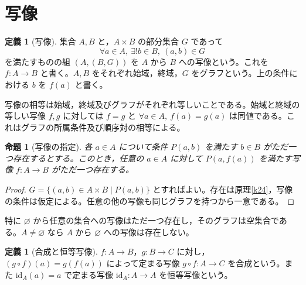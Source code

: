 \documentclass[a5paper,10pt,dvipdfmx]{jsarticle}
\theoremstyle{definition}
\newtheorem{defn}[ruledef]{定義}
\theoremstyle{plain}
\newtheorem{prop}[ruledef]{命題}
\newcommand{\id}{\mathrm{id}}
\begin{document}
\section{写像}
\begin{defn}[写像]\label{k34}
集合 $A,B$ と，$A\times B$ の部分集合 $G$ であって
\[
 \forall a\in A,\ \exists!b\in B,\ (a,b)\in G
\]
を満たすものの組 $(A,(B,G))$ を $A$ から $B$ への写像という。これを $f:A\to B$ と書く。$A,B$ をそれぞれ始域，終域，$G$ をグラフという。上の条件における $b$ を $f(a)$ と書く。
\end{defn}
写像の相等は始域，終域及びグラフがそれぞれ等しいことである。始域と終域の等しい写像 $f,g$ に対しては $f=g$ と $\forall a\in A,\ f(a)=g(a)$ は同値である。これはグラフの所属条件及び順序対の相等による。
\begin{prop}[写像の指定]\label{k35}
各 $a\in A$ について条件 $P(a,b)$ を満たす $b\in B$ がただ一つ存在するとする。このとき，任意の $a\in A$ に対して $P(a,f(a))$ を満たす写像 $f:A\to B$ がただ一つ存在する。
\end{prop}
\begin{proof}
$G=\{(a,b)\in A\times B\mid P(a,b)\}$ とすればよい。存在は原理\ref{k24}，写像の条件は仮定による。任意の他の写像も同じグラフを持つから一意である。
\end{proof}
特に $\varnothing$ から任意の集合への写像はただ一つ存在し，そのグラフは空集合である。$A\ne\varnothing$ なら $A$ から $\varnothing$ への写像は存在しない。
\begin{defn}[合成と恒等写像]\label{k36}
$f:A\to B$，$g:B\to C$ に対し，$(g\circ f)(a)=g(f(a))$ によって定まる写像 $g\circ f:A\to C$ を合成という。また $\id_A(a)=a$ で定まる写像 $\id_A:A\to A$ を恒等写像という。
\end{defn}
\end{document}
